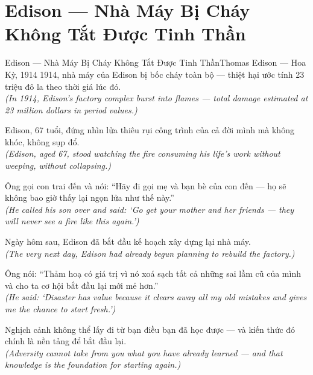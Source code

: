 \section{Edison --- Nhà Máy Bị Cháy Không Tắt Được Tinh Thần}
\begin{truyen}{Edison --- Nhà Máy Bị Cháy Không Tắt Được Tinh Thần}{Thomas Edison --- Hoa Kỳ, 1914}
 1914, nhà máy của Edison bị bốc cháy toàn bộ --- thiệt hại ước tính 23 triệu đô la theo thời giá lúc đó.\\[4pt]
\textit{(In 1914, Edison's factory complex burst into flames --- total damage estimated at 23 million dollars in period values.)}

Edison, 67 tuổi, đứng nhìn lửa thiêu rụi công trình của cả đời mình mà không khóc, không sụp đổ.\\[4pt]
\textit{(Edison, aged 67, stood watching the fire consuming his life's work without weeping, without collapsing.)}

Ông gọi con trai đến và nói: ``Hãy đi gọi mẹ và bạn bè của con đến --- họ sẽ không bao giờ thấy lại ngọn lửa như thế này.''\\[4pt]
\textit{(He called his son over and said: `Go get your mother and her friends --- they will never see a fire like this again.')}

Ngày hôm sau, Edison đã bắt đầu kế hoạch xây dựng lại nhà máy.\\[4pt]
\textit{(The very next day, Edison had already begun planning to rebuild the factory.)}

Ông nói: ``Thảm hoạ có giá trị vì nó xoá sạch tất cả những sai lầm cũ của mình và cho ta cơ hội bắt đầu lại mới mẻ hơn.''\\[4pt]
\textit{(He said: `Disaster has value because it clears away all my old mistakes and gives me the chance to start fresh.')}

\end{truyen}
\begin{baihoc}
  Nghịch cảnh không thể lấy đi từ bạn điều bạn đã học được --- và kiến thức đó chính là nền tảng để bắt đầu lại.\\[4pt]
  \textit{(Adversity cannot take from you what you have already learned --- and that knowledge is the foundation for starting again.)}
\end{baihoc}

